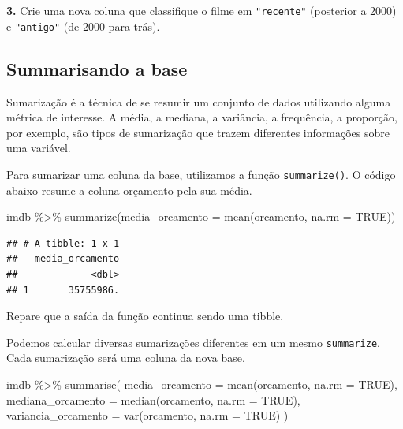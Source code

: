 \documentclass[
]{book}
\newenvironment{Shaded}{\begin{snugshade}}{\end{snugshade}}
\newcommand{\AttributeTok}[1]{\textcolor[rgb]{0.77,0.63,0.00}{#1}}
\newcommand{\ConstantTok}[1]{\textcolor[rgb]{0.00,0.00,0.00}{#1}}
\newcommand{\FunctionTok}[1]{\textcolor[rgb]{0.00,0.00,0.00}{#1}}
\newcommand{\NormalTok}[1]{#1}
\newcommand{\SpecialCharTok}[1]{\textcolor[rgb]{0.00,0.00,0.00}{#1}}
\begin{document}
\textbf{3.} Crie uma nova coluna que classifique o filme em \texttt{"recente"} (posterior a 2000) e \texttt{"antigo"} (de 2000 para trás).

\hypertarget{summarisando-a-base}{%
\subsection{Summarisando a base}\label{summarisando-a-base}}

Sumarização é a técnica de se resumir um conjunto de dados utilizando alguma métrica de interesse. A média, a mediana, a variância, a frequência, a proporção, por exemplo, são tipos de sumarização que trazem diferentes informações sobre uma variável.

Para sumarizar uma coluna da base, utilizamos a função \texttt{summarize()}. O código abaixo resume a coluna orçamento pela sua média.

\begin{Shaded}
\begin{Highlighting}[]
\NormalTok{imdb }\SpecialCharTok{\%\textgreater{}\%} \FunctionTok{summarize}\NormalTok{(}\AttributeTok{media\_orcamento =} \FunctionTok{mean}\NormalTok{(orcamento, }\AttributeTok{na.rm =} \ConstantTok{TRUE}\NormalTok{))}
\end{Highlighting}
\end{Shaded}

\begin{verbatim}
## # A tibble: 1 x 1
##   media_orcamento
##             <dbl>
## 1       35755986.
\end{verbatim}

Repare que a saída da função continua sendo uma tibble.

Podemos calcular diversas sumarizações diferentes em um mesmo \texttt{summarize}. Cada sumarização será uma coluna da nova base.

\begin{Shaded}
\begin{Highlighting}[]
\NormalTok{imdb }\SpecialCharTok{\%\textgreater{}\%} \FunctionTok{summarise}\NormalTok{(}
  \AttributeTok{media\_orcamento =} \FunctionTok{mean}\NormalTok{(orcamento, }\AttributeTok{na.rm =} \ConstantTok{TRUE}\NormalTok{),}
  \AttributeTok{mediana\_orcamento =} \FunctionTok{median}\NormalTok{(orcamento, }\AttributeTok{na.rm =} \ConstantTok{TRUE}\NormalTok{),}
  \AttributeTok{variancia\_orcamento =} \FunctionTok{var}\NormalTok{(orcamento, }\AttributeTok{na.rm =} \ConstantTok{TRUE}\NormalTok{)}
\NormalTok{)}
\end{Highlighting}
\end{Shaded}
\end{document}
